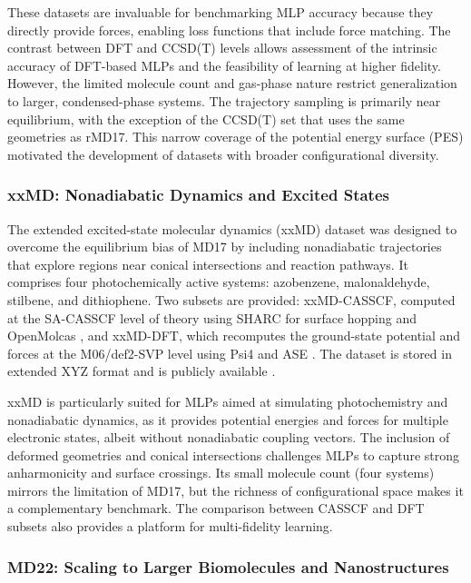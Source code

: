 \documentclass[12pt]{article}
\begin{document}
These datasets are invaluable for benchmarking MLP accuracy because they directly provide forces, enabling loss functions that include force matching. The contrast between DFT and CCSD(T) levels allows assessment of the intrinsic accuracy of DFT-based MLPs and the feasibility of learning at higher fidelity. However, the limited molecule count and gas-phase nature restrict generalization to larger, condensed-phase systems. The trajectory sampling is primarily near equilibrium, with the exception of the CCSD(T) set that uses the same geometries as rMD17. This narrow coverage of the potential energy surface (PES) motivated the development of datasets with broader configurational diversity.

\subsubsection*{xxMD: Nonadiabatic Dynamics and Excited States}

The extended excited-state molecular dynamics (xxMD) dataset \cite{ds21-51} was designed to overcome the equilibrium bias of MD17 by including nonadiabatic trajectories that explore regions near conical intersections and reaction pathways. It comprises four photochemically active systems: azobenzene, malonaldehyde, stilbene, and dithiophene. Two subsets are provided: xxMD-CASSCF, computed at the SA-CASSCF level of theory \cite{ds21-125} using SHARC for surface hopping \cite{ds21-124} and OpenMolcas \cite{ds21-126}, and xxMD-DFT, which recomputes the ground-state potential and forces at the M06/def2-SVP level \cite{ds21-127} using Psi4 and ASE \cite{ds21-128}. The dataset is stored in extended XYZ format and is publicly available \cite{ds21-129}.

xxMD is particularly suited for MLPs aimed at simulating photochemistry and nonadiabatic dynamics, as it provides potential energies and forces for multiple electronic states, albeit without nonadiabatic coupling vectors. The inclusion of deformed geometries and conical intersections challenges MLPs to capture strong anharmonicity and surface crossings. Its small molecule count (four systems) mirrors the limitation of MD17, but the richness of configurational space makes it a complementary benchmark. The comparison between CASSCF and DFT subsets also provides a platform for multi-fidelity learning.

\subsubsection*{MD22: Scaling to Larger Biomolecules and Nanostructures}
\end{document}
